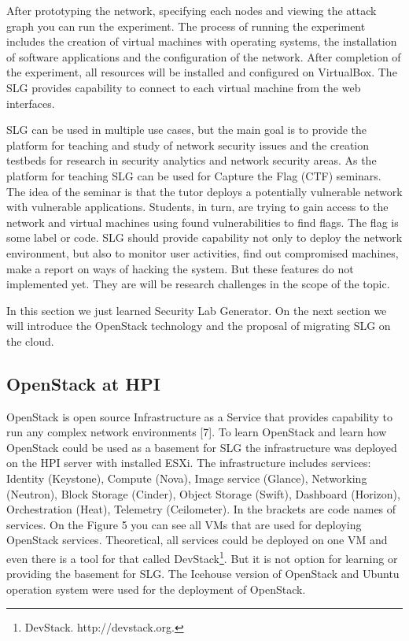 After prototyping the network, specifying each nodes and viewing the attack graph you can run the experiment. The process of running the experiment includes the creation of virtual machines with operating systems, the installation of software applications and the configuration of the network. After completion of the experiment, all resources will be installed and configured on VirtualBox. The SLG provides capability to connect to each virtual machine from the web interfaces. 


SLG can be used in multiple use cases, but the main goal is to provide the platform for teaching and study of network security issues and the creation testbeds for research in security analytics and network security areas. 
As the platform for teaching SLG can be used for Capture the Flag (CTF) seminars. The idea of the seminar is that the tutor deploys a potentially vulnerable network with vulnerable applications. Students, in turn, are trying to gain access to the network and virtual machines using found vulnerabilities to find flags. The flag is some label or code. SLG should provide capability not only to deploy the network environment, but also to monitor user activities, find out compromised machines, make a report on ways of hacking the system. But these features do not implemented yet.  They are will be research challenges in the scope of the topic.
  
  
In this section we just learned Security Lab Generator. On the next section we will introduce the OpenStack technology and the proposal of migrating SLG on the cloud.


 




\subsection{OpenStack at HPI}
OpenStack is open source Infrastructure as a Service that provides capability to run any complex network environments [7]. To learn OpenStack and learn how OpenStack could be used as a basement for SLG the infrastructure was deployed on the HPI server with installed ESXi. The infrastructure includes services: Identity (Keystone), Compute (Nova), Image service (Glance), Networking (Neutron), Block Storage (Cinder), Object Storage (Swift), Dashboard (Horizon), Orchestration (Heat), Telemetry (Ceilometer). In the brackets are code names of services. On the Figure 5 you can see all VMs that are used for deploying OpenStack services. Theoretical, all services could be deployed on one VM and even there is a tool for that called DevStack\footnote{DevStack. http://devstack.org.}. But it is not option for learning or providing the basement for SLG. The Icehouse version of OpenStack and Ubuntu operation system were used for the deployment of OpenStack.  

